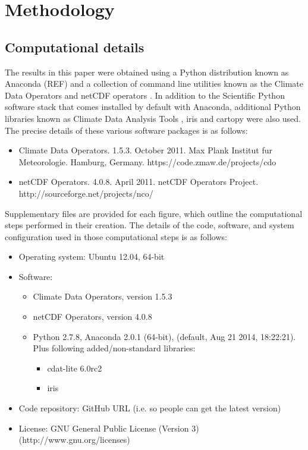 \section{Methodology}\label{s:methodology}

\subsection{Computational details}\label{s:computational_details}

The results in this paper were obtained using a Python distribution known as Anaconda (REF) and a collection of command line utilities known as the Climate Data Operators \citep[CDO;][]{Schulzweida2014} and netCDF operators \citep[NCO;][]{Zender2014}. In addition to the Scientific Python \citep[SciPy;][]{SciPy} software stack that comes installed by default with Anaconda, additional Python libraries known as Climate Data Analysis Tools \citep[CDAT;][]{Doutriaux2009}, iris \citep{Iris} and cartopy \citep{Cartopy} were also used. The precise details of these various software packages is as follows:
\begin{itemize}
\item Climate Data Operators. 1.5.3. October 2011. Max Plank Institut fur Meteorologie. Hamburg, Germany. https://code.zmaw.de/projects/cdo
\item netCDF Operators. 4.0.8. April 2011. netCDF Operators Project. http://sourceforge.net/projects/nco/

\end{itemize}


Supplementary files are provided for each figure, which outline the computational steps performed in their creation. The details of the code, software, and system configuration used in those computational steps is as follows:   
\begin{itemize}
\item Operating system: Ubuntu 12.04, 64-bit %
\item Software: 
\begin{itemize}
\item Climate Data Operators, version 1.5.3 \citep{Schulzweida2014} %
\item netCDF Operators, version 4.0.8 \citep{Zender2014} %
\item Python 2.7.8, Anaconda 2.0.1 (64-bit), (default, Aug 21 2014, 18:22:21). Plus following added/non-standard libraries:  %
\begin{itemize}
\item cdat-lite 6.0rc2 %
\item iris \citep{Iris}
\end{itemize}
\end{itemize}
\item Code repository: GitHub URL (i.e. so people can get the latest version)
\item License: GNU General Public License (Version 3) (http://www.gnu.org/licenses) %
\end{itemize}



